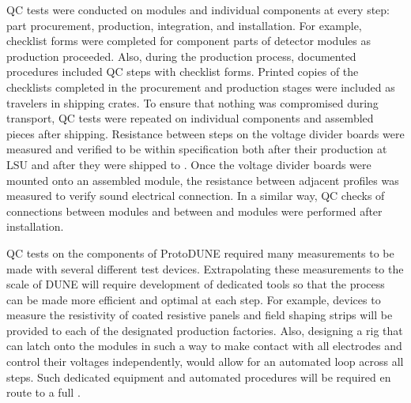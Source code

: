 QC tests were conducted on  modules and individual components at every step: %
part procurement, production, integration, and installation.  For example, checklist forms were completed for component parts of detector modules as production proceeded.  Also, during the production process, documented procedures included QC steps with checklist forms.  Printed copies of the checklists completed in the procurement and production stages were included as travelers in shipping crates.  
To ensure that nothing was compromised during transport, QC tests were repeated on individual components and assembled pieces after shipping. 
Resistance between steps on the voltage divider boards were measured and verified to be within specification both after their production at LSU and after they were shipped to .
Once the voltage divider boards were mounted onto an assembled  module, the resistance between adjacent profiles was measured to verify sound electrical connection.
In a similar way, QC checks of connections between  modules and between  and  modules were performed after installation.

QC tests on the  components of ProtoDUNE required many measurements to be made with several different test devices.  Extrapolating these measurements to the scale of DUNE will require development of dedicated tools so that the  process can be made more efficient and optimal at each step.
For example, devices to measure the resistivity of  coated resistive panels and field shaping strips will be provided to each of the designated production factories.  Also, designing a rig that can latch onto the  modules in such a way to make contact with all electrodes and control their voltages independently, would allow for an automated loop across all steps.
Such dedicated equipment and automated procedures will be required en route to a full .

